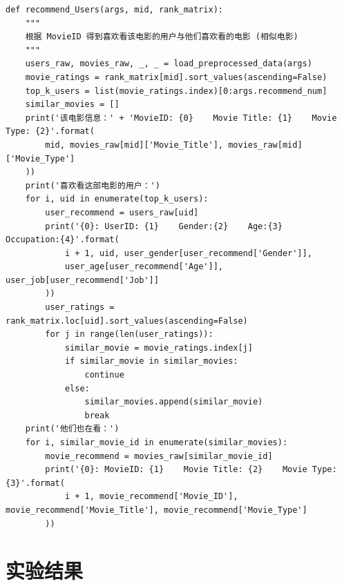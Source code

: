 \begin{spacing}{1.5}
\begin{lstlisting}
def recommend_Users(args, mid, rank_matrix):
    """
    根据 MovieID 得到喜欢看该电影的用户与他们喜欢看的电影 (相似电影)
    """
    users_raw, movies_raw, _, _ = load_preprocessed_data(args)
    movie_ratings = rank_matrix[mid].sort_values(ascending=False)
    top_k_users = list(movie_ratings.index)[0:args.recommend_num]
    similar_movies = []
    print('该电影信息：' + 'MovieID: {0}    Movie Title: {1}    Movie Type: {2}'.format(
        mid, movies_raw[mid]['Movie_Title'], movies_raw[mid]['Movie_Type']
    ))
    print('喜欢看这部电影的用户：')
    for i, uid in enumerate(top_k_users):
        user_recommend = users_raw[uid]
        print('{0}: UserID: {1}    Gender:{2}    Age:{3}    Occupation:{4}'.format(
            i + 1, uid, user_gender[user_recommend['Gender']],
            user_age[user_recommend['Age']], user_job[user_recommend['Job']]
        ))
        user_ratings = rank_matrix.loc[uid].sort_values(ascending=False)
        for j in range(len(user_ratings)):
            similar_movie = movie_ratings.index[j]
            if similar_movie in similar_movies:
                continue
            else:
                similar_movies.append(similar_movie)
                break
    print('他们也在看：')
    for i, similar_movie_id in enumerate(similar_movies):
        movie_recommend = movies_raw[similar_movie_id]
        print('{0}: MovieID: {1}    Movie Title: {2}    Movie Type: {3}'.format(
            i + 1, movie_recommend['Movie_ID'], movie_recommend['Movie_Title'], movie_recommend['Movie_Type']
        ))
\end{lstlisting}
\end{spacing}

\section{实验结果}
